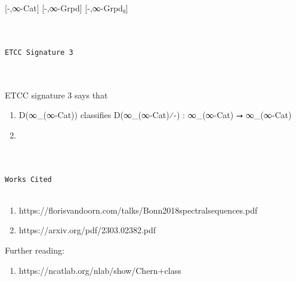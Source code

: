 \documentclass{book}
\theoremstyle{definition}
\newtheorem{definition}{Definition}
\renewcommand{\chapter}[1]{
\newpage
{
\Huge 
\begin{center}
\ \\
\ \\
\thispagestyle{empty}
\texttt{#1}
\end{center}}
\ \\
\ \\
}
\begin{document}
[-,∞-Cat]
[-,∞-Grpd]
[-,∞-Grpd₀]

\fi


\chapter{ETCC Signature 3}

ETCC signature 3 says that 

\begin{enumerate}
\item D(∞\_(∞-Cat)) classifies D(∞\_(∞-Cat)⁄-) : ∞\_(∞-Cat) ⭢ ∞\_(∞-Cat)
\item 
\end{enumerate}

\newpage
{
\Huge 
\begin{center}
\ \\
\ \\
\texttt{Works Cited}
\ \\
\ \\
\end{center}
\thispagestyle{empty}
}



\begin{enumerate}
\item https://florisvandoorn.com/talks/Bonn2018spectralsequences.pdf
\item https://arxiv.org/pdf/2303.02382.pdf
\end{enumerate}

Further reading:

\begin{enumerate}
\item https://ncatlab.org/nlab/show/Chern+class
\end{enumerate}
\fi
\end{document}
